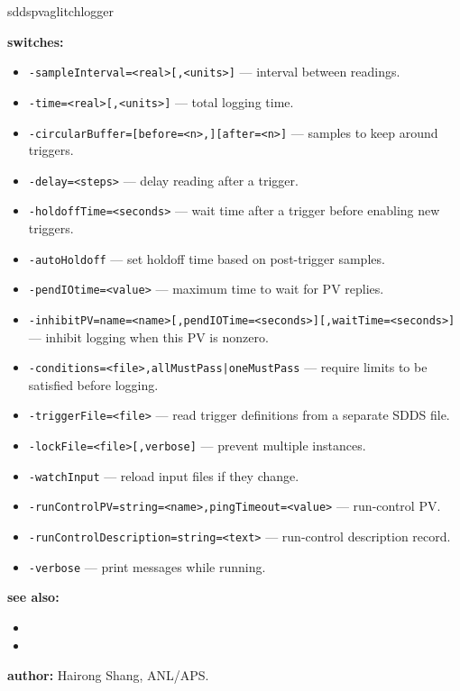 \begin{sddsprog}{sddspvaglitchlogger}
\item \textbf{switches:}
\begin{itemize}
  \item {\tt -sampleInterval=<real>[,<units>]} --- interval between readings.
  \item {\tt -time=<real>[,<units>]} --- total logging time.
  \item {\tt -circularBuffer=[before=<n>,][after=<n>]} --- samples to keep around triggers.
  \item {\tt -delay=<steps>} --- delay reading after a trigger.
  \item {\tt -holdoffTime=<seconds>} --- wait time after a trigger before enabling new triggers.
  \item {\tt -autoHoldoff} --- set holdoff time based on post-trigger samples.
  \item {\tt -pendIOtime=<value>} --- maximum time to wait for PV replies.
  \item {\tt -inhibitPV=name=<name>[,pendIOTime=<seconds>][,waitTime=<seconds>]} --- inhibit logging when this PV is nonzero.
  \item {\tt -conditions=<file>,{allMustPass|oneMustPass}} --- require limits to be satisfied before logging.
  \item {\tt -triggerFile=<file>} --- read trigger definitions from a separate SDDS file.
  \item {\tt -lockFile=<file>[,verbose]} --- prevent multiple instances.
  \item {\tt -watchInput} --- reload input files if they change.
  \item {\tt -runControlPV=string=<name>,pingTimeout=<value>} --- run-control PV.
  \item {\tt -runControlDescription=string=<text>} --- run-control description record.
  \item {\tt -verbose} --- print messages while running.
\end{itemize}

\item \textbf{see also:}
\begin{itemize}
  \item {}
  \item {}
\end{itemize}

\item \textbf{author:} Hairong Shang, ANL/APS.
\end{sddsprog}


